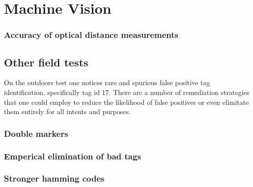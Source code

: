 \section{Machine Vision}
\subsubsection{Accuracy of optical distance measurements}
\subsection{Other field tests}
On the outdoors test one notices rare and spurious false positive tag identification, specifically tag id 17. There are a number of remediation strategies that one could employ to reduce the likelihood of false positives or even elimitate them entirely for all intents and purposes.
\subsubsection{Double markers}
\subsubsection{Emperical elimination of bad tags}
\subsubsection{Stronger hamming codes}
